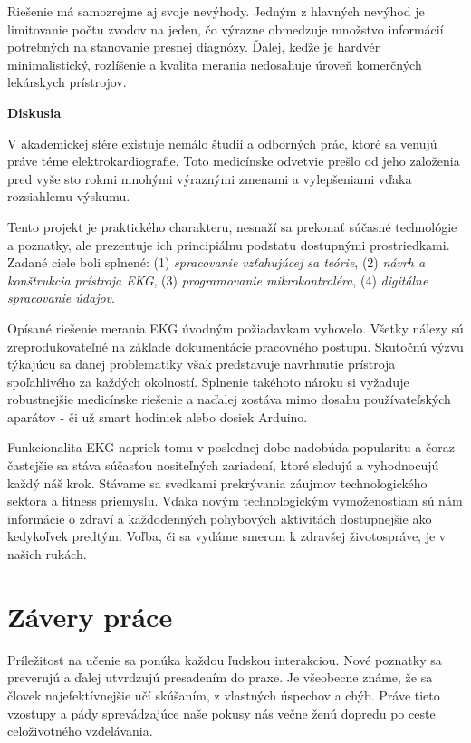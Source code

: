 \documentclass[titlepage,12pt]{article}
\begin{document}
Riešenie má samozrejme aj svoje nevýhody. Jedným z hlavných nevýhod je limitovanie počtu zvodov na jeden, čo výrazne obmedzuje množstvo informácií potrebných na stanovanie presnej diagnózy. Ďalej, keďže je hardvér minimalistický, rozlíšenie a kvalita merania nedosahuje úroveň komerčných lekárskych prístrojov.
\\
\bigskip

\textbf{Diskusia}

V akademickej sfére existuje nemálo študií a odborných prác, ktoré sa venujú práve téme elektrokardiografie. Toto medicínske odvetvie prešlo od jeho založenia pred vyše sto rokmi mnohými výraznými zmenami a vylepšeniami vďaka rozsiahlemu výskumu.

Tento projekt je praktického charakteru, nesnaží sa prekonať súčasné technológie a poznatky, ale prezentuje ich principiálnu podstatu dostupnými prostriedkami.  Zadané ciele boli splnené: (1) \textit{spracovanie vzťahujúcej sa teórie}, (2) \textit{návrh a konštrukcia prístroja EKG}, (3) \textit{programovanie mikrokontroléra}, (4) \textit{digitálne spracovanie údajov}.

Opísané riešenie merania EKG úvodným požiadavkam vyhovelo. Všetky nálezy sú zreprodukovateľné na základe dokumentácie pracovného postupu. Skutočnú výzvu týkajúcu sa danej problematiky však predstavuje navrhnutie prístroja spoľahlivého za každých okolností. Splnenie takéhoto nároku si vyžaduje robustnejšie medicínske riešenie a naďalej zostáva mimo dosahu používateľských aparátov - či už smart hodiniek alebo dosiek Arduino.

Funkcionalita EKG napriek tomu v poslednej dobe nadobúda popularitu a čoraz častejšie sa stáva súčasťou nositeľných zariadení, ktoré sledujú a vyhodnocujú každý náš krok. Stávame sa svedkami prekrývania záujmov technologického sektora a fitness priemyslu. Vďaka novým technologickým vymoženostiam sú nám informácie o zdraví a každodenných pohybových aktivitách dostupnejšie ako kedykoľvek predtým. Voľba, či sa vydáme smerom k zdravšej životospráve, je v našich rukách.



\newpage
\section{Závery práce}
Príležitosť na učenie sa ponúka každou ľudskou interakciou. Nové poznatky sa preverujú a ďalej utvrdzujú presadením do praxe. Je všeobecne známe, že sa človek najefektívnejšie učí skúšaním, z vlastných úspechov a chýb. Práve tieto vzostupy a pády sprevádzajúce naše pokusy nás večne ženú dopredu po ceste celoživotného vzdelávania.
\end{document}
